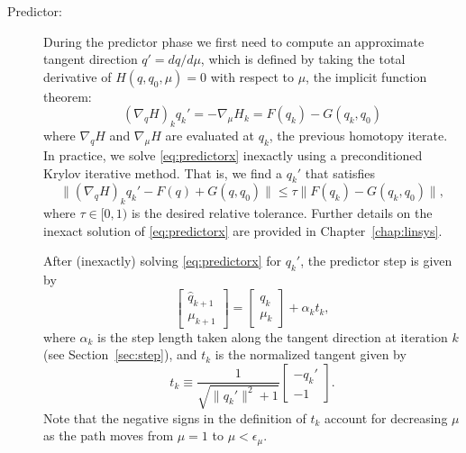 \begin{description}

  \item[Predictor:] During the predictor phase we first need to compute an
    approximate tangent direction $q' = dq/d\mu$, which is defined by taking the
    total derivative of $H(q,q_0,\mu) = 0$ with respect to $\mu$, \ie the
    implicit function theorem:
    \begin{equation}
      \left(\nabla_q H\right)_{k} q_{k}' = -\nabla_\mu H_{k} = F(q_k)  - G(q_k,q_0)
      \label{eq:predictorx}
    \end{equation}
    where $\nabla_q H$ and $\nabla_\mu H$ are evaluated at $q_k$, the previous
    homotopy iterate.  In practice, we solve \eqref{eq:predictorx} inexactly
    using a preconditioned Krylov iterative method.  That is, we find a $q_{k}'$
    that satisfies
    \begin{equation*}
      \lVert \left(\nabla_q H\right)_{k} q_{k}' - F(q) + G(q,q_0) \rVert
      \leq \tau \lVert F(q_k)  - G(q_k,q_0) \rVert,
    \end{equation*}
    where $\tau \in [0,1)$ is the desired relative tolerance.  Further details
      on the inexact solution of \eqref{eq:predictorx} are provided in
      Chapter~\ref{chap:linsys}.
    
    After (inexactly) solving \eqref{eq:predictorx} for $q_{k}'$, the predictor
    step is given by
    \begin{equation*}\label{eq:pred}
      \begin{bmatrix}
        \hat{q}_{k+1} \\ \mu_{k+1} 
      \end{bmatrix} 
      = \begin{bmatrix}
        q_k \\ \mu_k 
      \end{bmatrix}      
      + \alpha_{k} t_{k},
    \end{equation*}
    where $\alpha_{k}$ is the step length taken along the tangent direction at
    iteration $k$ (see Section~\ref{sec:step}), and $t_k$ is the normalized
    tangent given by
    \begin{equation*}
      t_{k} \equiv \frac{1}{\sqrt{\|q_{k}'\|^2 + 1}} \begin{bmatrix} -q_k'
        \\ -1 \end{bmatrix}.
    \end{equation*}
    Note that the negative signs in the definition of $t_k$ account for
    decreasing $\mu$ as the path moves from $\mu=1$ to $\mu <
\epsilon_\mu$.


\end{description}
